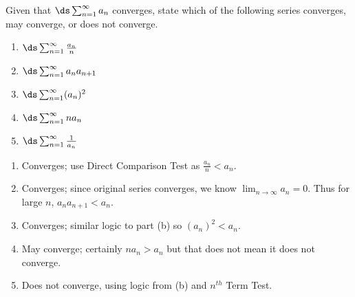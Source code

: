 {Given that $\ds \sum_{n=1}^\infty a_n$ converges, state which of the following series converges, may converge, or does not converge.
\begin{enumerate}
	\item $\ds \sum_{n=1}^\infty \frac{a_n}n$
	\item	$\ds \sum_{n=1}^\infty a_na_{n+1}$
	\item	$\ds \sum_{n=1}^\infty (a_n)^2$
	\item $\ds \sum_{n=1}^\infty na_n$
	\item	$\ds \sum_{n=1}^\infty \frac{1}{a_n}$
\end{enumerate}
}
{\begin{enumerate}
	\item Converges; use Direct Comparison Test as $\frac{a_n}{n}<a_n$.
	\item	Converges; since original series converges, we know $\lim_{n\to\infty}a_n = 0$. Thus for large $n$, $a_na_{n+1} < a_n$.
	\item		Converges; similar logic to part (b) so $(a_n)^2<a_n$.
	\item		May converge; certainly $na_n > a_n$ but that does not mean it does not converge.
	\item		Does not converge, using logic from (b) and $n^{th}$ Term Test.
\end{enumerate}
}